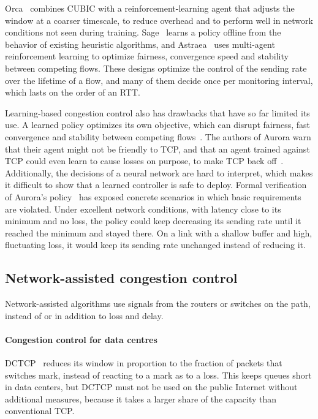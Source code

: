 Orca~\cite{abbasloo2020orca} combines CUBIC
with a reinforcement-learning agent that adjusts the window at a coarser timescale,
to reduce overhead and to perform well in network conditions not seen during
training. Sage~\cite{yen2023sage} learns a policy offline from the behavior of
existing heuristic algorithms, and Astraea~\cite{liao2024astraea} uses multi-agent
reinforcement learning to optimize fairness, convergence speed and stability between
competing flows. These designs optimize the control of the
sending rate over the lifetime of a flow, and many of them decide once per monitoring
interval, which lasts on the order of an RTT. 

Learning-based congestion control also has drawbacks that have so far limited its use.
A learned policy optimizes its own objective,
which can disrupt fairness, fast convergence and stability between competing
flows~\cite{liao2024astraea}. The authors of Aurora warn that their agent might not be
friendly to TCP, and that an agent trained against TCP could even learn to cause
losses on purpose, to make TCP back off~\cite{jay2019aurora}. Additionally, the decisions of
a neural network are hard to interpret, which makes it difficult to show that a
learned controller is safe to deploy. Formal verification of Aurora's policy~\cite{eliyahu2021verifying} has
exposed concrete scenarios in which basic requirements are violated. Under excellent
network conditions, with latency close to its minimum and no loss, the policy could
keep decreasing its sending rate until it reached the minimum and stayed there. On a
link with a shallow buffer and high, fluctuating loss, it would keep its sending rate
unchanged instead of reducing it.


\subsection{Network-assisted congestion control}\label{sec:rw-network}

Network-assisted algorithms use signals from the routers or switches on the path,
instead of or in addition to loss and delay.

\paragraph{Congestion control for data centres} DCTCP~\cite{rfc8257} reduces its window in
proportion to the fraction of packets that switches mark, instead of reacting to a mark
as to a loss. This keeps queues short in data centers, but DCTCP must not be used on
the public Internet without additional measures, because it takes a larger share of
the capacity than conventional TCP.

